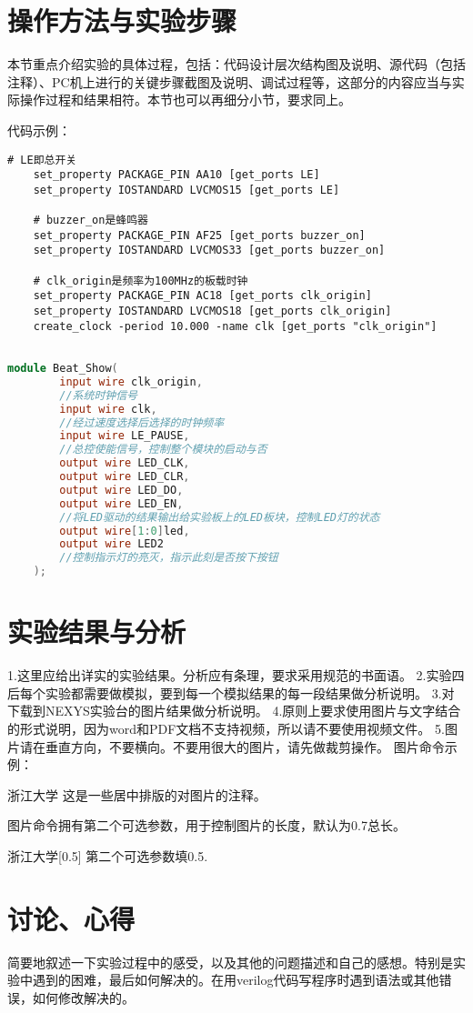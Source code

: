 \documentclass{codLab}
\begin{document}
	\section{操作方法与实验步骤}
	本节重点介绍实验的具体过程，包括：代码设计层次结构图及说明、源代码（包括注释）、PC机上进行的关键步骤截图及说明、调试过程等，这部分的内容应当与实际操作过程和结果相符。本节也可以再细分小节，要求同上。
	
	代码示例：
	
\begin{lstlisting}[caption=xdc代码,language=xdc]
	# LE即总开关
	set_property PACKAGE_PIN AA10 [get_ports LE]  
	set_property IOSTANDARD LVCMOS15 [get_ports LE]  
	
	# buzzer_on是蜂鸣器  
	set_property PACKAGE_PIN AF25 [get_ports buzzer_on]  
	set_property IOSTANDARD LVCMOS33 [get_ports buzzer_on]
	
	# clk_origin是频率为100MHz的板载时钟  
	set_property PACKAGE_PIN AC18 [get_ports clk_origin]  
	set_property IOSTANDARD LVCMOS18 [get_ports clk_origin]  
	create_clock -period 10.000 -name clk [get_ports "clk_origin"]
	
\end{lstlisting}
\begin{lstlisting}[title=verilog代码,language=verilog]
	module Beat_Show(
		input wire clk_origin,
		//系统时钟信号
		input wire clk,
		//经过速度选择后选择的时钟频率
		input wire LE_PAUSE,
		//总控使能信号，控制整个模块的启动与否
		output wire LED_CLK,
		output wire LED_CLR,
		output wire LED_DO,
		output wire LED_EN,
		//将LED驱动的结果输出给实验板上的LED板块，控制LED灯的状态
		output wire[1:0]led,
		output wire LED2
		//控制指示灯的亮灭，指示此刻是否按下按钮
	);
\end{lstlisting}
	\section{实验结果与分析}
	1.这里应给出详实的实验结果。分析应有条理，要求采用规范的书面语。
	2.实验四后每个实验都需要做模拟，要到每一个模拟结果的每一段结果做分析说明。
	3.对下载到NEXYS实验台的图片结果做分析说明。
	4.原则上要求使用图片与文字结合的形式说明，因为word和PDF文档不支持视频，所以请不要使用视频文件。
	5.图片请在垂直方向，不要横向。不要用很大的图片，请先做裁剪操作。
	图片命令示例：
	\begin{singlefigure}[标题]{浙江大学}
		这是一些居中排版的对图片的注释。
	\end{singlefigure}
	图片命令拥有第二个可选参数，用于控制图片的长度，默认为0.7总长。
	\begin{singlefigure}[控制为0.5总长]{浙江大学}[0.5]
		第二个可选参数填0.5.
	\end{singlefigure}
	\section{讨论、心得}
	简要地叙述一下实验过程中的感受，以及其他的问题描述和自己的感想。特别是实验中遇到的困难，最后如何解决的。在用verilog代码写程序时遇到语法或其他错误，如何修改解决的。
\end{document}
